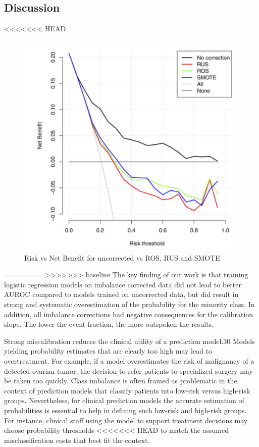 \subsection{Discussion}
<<<<<<< HEAD
	\begin{figure}[h]
         	\includegraphics[height=0.5\textheight]{assets/harm_class_imbalance_corr/risk_benefit_SMOTE_RUS_ROS.png}
         	\caption{Risk vs Net Benefit for uncorrected vs ROS, RUS and SMOTE}
         \end{figure}
=======
>>>>>>> baseline
	The key finding of our work is that training logistic regression models on imbalance corrected data did not lead to better AUROC 
	compared to models trained on uncorrected data, but did result in strong and systematic overestimation of the probability for the minority class. 
	In addition, all imbalance corrections had negative consequences for the calibration slope. 
	The lower the event fraction, the more outspoken the results.
	
	Strong miscalibration reduces the clinical utility of a prediction model.30 Models yielding probability estimates that are clearly too high may lead to overtreatment. 
	For example, if a model overestimates the risk of malignancy of a detected ovarian tumor, the decision to refer patients to specialized surgery may be taken too quickly. 
	Class imbalance is often framed as problematic in the context of prediction models that classify patients into low-risk versus high-risk groups. 
	Nevertheless, for clinical prediction models the accurate estimation of probabilities is essential to help in defining such low-risk and high-risk groups. 
	For instance, clinical staff using the model to support treatment decisions may choose probability thresholds
<<<<<<< HEAD
	to match the assumed misclassification costs that best fit the context.
	
